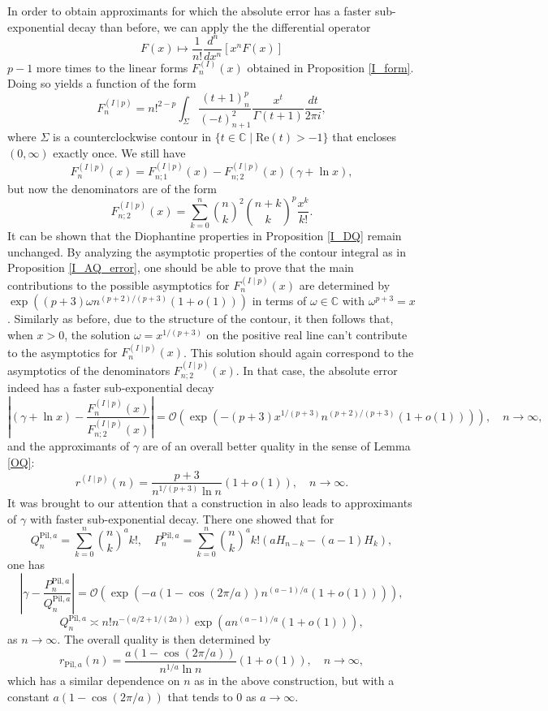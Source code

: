 \documentclass[a4paper,12pt,oneside]{article}
\theoremstyle{definition}
\newcommand{\C}{\mathbb{C}}
\newcommand{\BO}{\mathcal{O}}
\begin{document}
In order to obtain approximants for which the absolute error has a faster sub-exponential decay than before, we can apply the the differential operator 
    $$F(x) \mapsto \frac{1}{n!}\frac{d^n}{dx^n} [x^n F(x)]$$
$p-1$ more times to the linear forms $F_n^{(I)}(x)$ obtained in Proposition \ref{I_form}. Doing so yields a function of the form
$$F_n^{(I\mid p)} = n!^{2-p} \int_{\Sigma} \frac{(t+1)_{n}^p}{(-t)_{n+1}^2}  \frac{x^t}{\Gamma(t+1)} \frac{dt}{2\pi i},$$
where $\Sigma$ is a counterclockwise contour in $\{t\in\C \mid \text{Re}(t)>-1\}$ that encloses $(0,\infty)$ exactly once. We still have
$$F_n^{(I\mid p)}(x) = F_{n;1}^{(I\mid p)}(x) - F_{n;2}^{(I\mid p)}(x) (\gamma+\ln x),$$
but now the denominators are of the form
    $$F_{n;2}^{(I\mid p)}(x) = \sum_{k=0}^n \binom{n}{k}^2 \binom{n+k}{k}^p \frac{x^k}{k!}. $$
It can be shown that the Diophantine properties in Proposition \ref{I_DQ} remain unchanged. By analyzing the asymptotic properties of the contour integral as in Proposition \ref{I_AQ_error}, one should be able to prove that the main contributions to the possible asymptotics for $F_n^{(I\mid p)}(x)$ are determined by $\exp((p+3)\omega n^{(p+2)/(p+3)}(1+o(1)))$ in terms of $\omega\in\C$ with $\omega^{p+3}=x$. Similarly as before, due to the structure of the contour, it then follows that, when $x>0$, the solution $\omega=x^{1/(p+3)}$ on the positive real line can't contribute to the asymptotics for $F_n^{(I\mid p)}(x)$. This solution should again correspond to the asymptotics of the denominators $F_{n;2}^{(I\mid p)}(x)$. In that case, the absolute error indeed has a faster sub-exponential decay
    $$ \left| (\gamma + \ln x) - \frac{F_{n}^{(I\mid p)}(x)}{F_{n;2}^{(I\mid p)}(x)}\right| = \BO(\exp(-(p+3) x^{1/(p+3)}n^{(p+2)/(p+3)}(1+o(1)))),\quad n\to\infty, $$
and the approximants of $\gamma$ are of an overall better quality in the sense of Lemma \ref{OQ}:
    $$ r^{(I\mid p)}(n) = \frac{p+3}{n^{1/(p+3)}\ln n} (1+o(1)),\quad n\to\infty . $$
It was brought to our attention that a construction in \cite[Theorem 1.1]{PilehroodEC} also leads to approximants of $\gamma$ with faster sub-exponential decay. There one showed that for
    $$Q_n^{\text{Pil},a} = \sum_{k=0}^n \binom{n}{k}^a k! ,\quad P_n^{\text{Pil},a} = \sum_{k=0}^n \binom{n}{k}^a k! (aH_{n-k}-(a-1) H_k),$$
one has
$$ \left| \gamma - \frac{P_n^{\text{Pil},a}}{Q_n^{\text{Pil},a}} \right| = \BO(\exp(-a (1-\cos(2\pi/a)) n^{(a-1)/a} (1+o(1)))),$$ 
$$Q_n^{\text{Pil},a} \asymp n! n^{-(a/2+1/(2a))} \exp( a n^{(a-1)/a} (1+o(1))), $$
as $n\to\infty$. The overall quality is then determined by
$$ r_{\text{Pil},a}(n) = \frac{a(1-\cos(2\pi/a))}{n^{1/a}\ln n} (1+o(1)),\quad n\to\infty, $$
which has a similar dependence on $n$ as in the above construction, but with a constant $a(1-\cos(2\pi/a))$ that tends to $0$ as $a\to\infty$.
\end{document}

